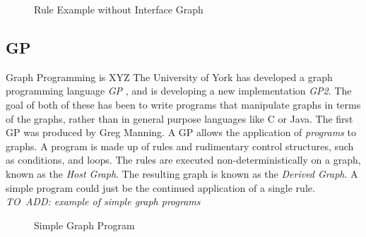 \documentclass{UoYCSproject}
\begin{document}
\begin{figure}
\label{fig:simple_rule_sans_k}
\centering
{}
\caption{Rule Example without Interface Graph}
\end{figure}

\subsection{GP}
Graph Programming is XYZ
The University of York has developed a graph programming language \emph{GP} \cite{gp1}, and is developing a new implementation \emph{GP2}. The goal of both of these has been to write programs that manipulate graphs in terms of the graphs, rather than in general purpose languages like C or Java. The first GP was produced by Greg Manning. 
A GP allows the application of \emph{programs} to graphs. A program is made up of rules and rudimentary control structures, such as conditions, and loops. The rules are executed non-deterministically on a graph, known as the \emph{Host Graph}. The resulting graph is known as the \emph{Derived Graph}. A simple program could just be the continued application of a single rule.
\emph{TO~ADD: example of simple graph programs} %

\begin{figure}
\label{fig:simple_program}
\centering
{}
\caption{Simple Graph Program}
\end{figure}
\end{document}
